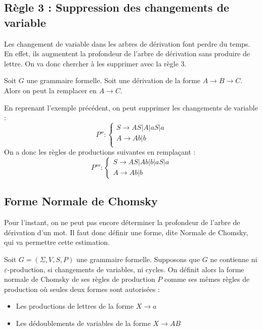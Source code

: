 \subsection{Règle 3 : Suppression des changements de variable}

Les changement de variable dans les arbres de dérivation font perdre du temps. 
En effet, ils augmentent la profondeur de l'arbre de dérivation sans produire de lettre. 
On va donc chercher à les supprimer avec la règle 3. 

\begin{definition}
    Soit $G$ une grammaire formelle. Soit une dérivation de la forme $ A \longrightarrow B \longrightarrow C$. 
    Alors on peut la remplacer en $A \longrightarrow C$. 
\end{definition}

\begin{example}
    En reprenant l'exemple précédent, on peut supprimer les changements de variable : 
    \[ P'' : 
            \begin{cases}
                S \longrightarrow AS | A | aS | a \\ 
                A \longrightarrow Ab | b \\ 
            \end{cases} \] 
    On a donc les règles de productions suivantes en remplaçant :
    \[ P''' : 
            \begin{cases}
                S \longrightarrow AS | Ab | b | aS | a \\ 
                A \longrightarrow Ab | b 
            \end{cases} \] 
\end{example}


\subsection{Forme Normale de Chomsky}

Pour l'instant, on ne peut pas encore déterminer la profondeur de l'arbre de dérivation d'un mot. 
Il faut donc définir une forme, dite Normale de Chomsky, qui va permettre cette estimation. 

\begin{definition}
    Soit $ G = (\Sigma, V, S, P)$ une grammaire formelle. 
    Supposons que $G$ ne contienne ni $\varepsilon$-production, si changements de variables, 
    ni cycles. On définit alors la forme normale de Chomsky de ses règles de production $P$ comme ses 
    mêmes règles de production où seules deux formes sont autorisées : 
    \begin{itemize}
        \item Les productions de lettres de la forme $ X \longrightarrow a$ 
        \item Les dédoublements de variables de la forme $ X \longrightarrow AB$ 
    \end{itemize}
\end{definition}

